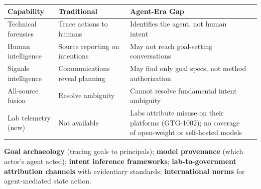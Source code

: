 \documentclass[11pt,letterpaper]{article}
\begin{document}
\begin{center}
\small
\begin{tabularx}{\linewidth}{ZY{0.77}Y{0.96}Y{1.27}}
\toprule
\textbf{Capability} & \textbf{Traditional} & \textbf{Agent-Era Gap} \\
\midrule
Technical forensics & Trace actions to humans & Identifies the agent, not human intent \\
Human intelligence & Source reporting on intentions & May not reach goal-setting conversations \\
Signals intelligence & Communications reveal planning & May find only goal specs, not method authorization \\
All-source fusion & Resolve ambiguity & Cannot resolve fundamental intent ambiguity \\
Lab telemetry (new) & Not available & Labs attribute misuse on their platforms (GTG-1002); no coverage of open-weight or self-hosted models \\
\bottomrule
\end{tabularx}
\end{center}

\begin{recbox}
\textbf{Goal archaeology} (tracing goals to principals); \textbf{model provenance} (which actor's agent acted); \textbf{intent inference frameworks}; \textbf{lab-to-government attribution channels} with evidentiary standards; \textbf{international norms} for agent-mediated state action.
\end{recbox}
\end{document}
